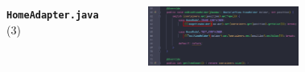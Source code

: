 \documentclass{beamer}
\begin{document}
\begin{frame}
\begin{columns}
\begin{figure}
        \end{figure}
        \indent \textbf{\texttt{HomeAdapter.java}} (3)
        \begin{figure}
            \centering
            \includegraphics[width=\textwidth]{images/20.png}
        \end{figure}
    \end{columns}
\end{frame}
\end{document}
